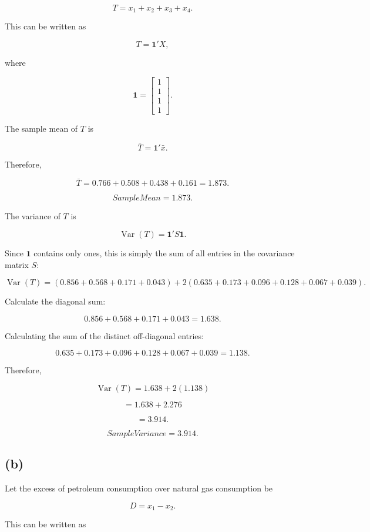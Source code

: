 \documentclass{article}
\begin{document}
$$
T=x_1+x_2+x_3+x_4.
$$

This can be written as

$$
T=\mathbf{1}'X,
$$

where

$$
\mathbf{1}=
\begin{bmatrix}
1\\
1\\
1\\
1
\end{bmatrix}.
$$

The sample mean of $T$ is

$$
\bar{T}=\mathbf{1}'\bar{x}.
$$

Therefore,

$$
\bar{T}
=
0.766+0.508+0.438+0.161
=
1.873.
$$

$$
\boxed{Sample Mean=1.873}.
$$

The variance of $T$ is

$$
\operatorname{Var}(T)=\mathbf{1}'S\mathbf{1}.
$$

Since $\mathbf{1}$ contains only ones, this is simply the sum of all
entries in the covariance matrix $S$:

$$
\operatorname{Var}(T)
=
(0.856+0.568+0.171+0.043)
+
2(0.635+0.173+0.096+0.128+0.067+0.039).
$$

Calculate the diagonal sum:

$$
0.856+0.568+0.171+0.043
=
1.638.
$$

Calculating the sum of the distinct off-diagonal entries:

$$
0.635+0.173+0.096+0.128+0.067+0.039
=
1.138.
$$

Therefore,

$$
\operatorname{Var}(T)
=
1.638+2(1.138)
$$

$$
=
1.638+2.276
$$

$$
=
3.914.
$$

$$
\boxed{Sample Variance=3.914}.
$$


\subsection*{(b)}

Let the excess of petroleum consumption over natural gas consumption be

$$
D=x_1-x_2.
$$

This can be written as
\end{document}
